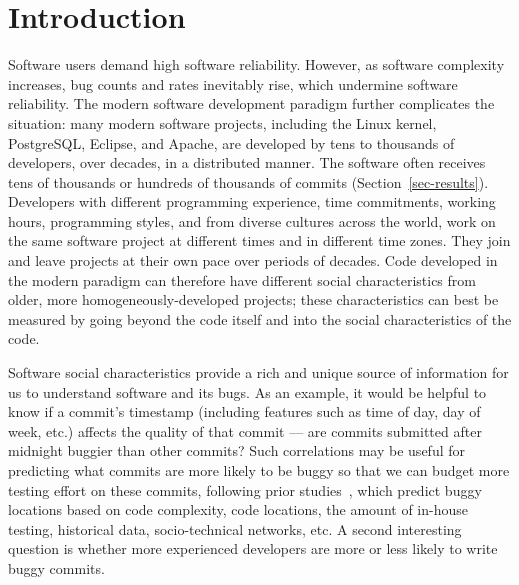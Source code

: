  

\section{Introduction}

Software users demand high software reliability. However, as software complexity
increases, bug counts and rates inevitably rise, which undermine software
reliability. The modern software development paradigm further complicates the
situation: many modern software projects, including the Linux kernel,
PostgreSQL, Eclipse, and Apache, are developed by tens to thousands of
developers, over decades, in a distributed manner. The software often receives
tens of thousands or hundreds of thousands of commits
(Section~\ref{sec-results}). Developers with different programming experience,
time commitments, working hours, programming
styles, and from diverse cultures across the world, work on the same
software project at different times and in different time zones. They join and
leave projects at their own pace over periods of decades. Code developed in the
modern paradigm can therefore have different social characteristics from older,
more homogeneously-developed projects; these characteristics can best be
measured by going beyond the code itself and into the social characteristics of
the code.

Software social characteristics provide a rich and unique source of information
for us to understand software and its bugs. As an example, it would be helpful
to know if a commit's timestamp (including features such as time of day, day of
week, etc.) affects the quality of that commit --- are commits submitted after
midnight buggier than other commits? Such correlations may be useful for
predicting what commits are more likely to be buggy so that we can budget more
testing effort on these commits, following prior
studies~\cite{graves00predicting, guo04robust, Hassan09, libre07, devNetwork08,
 predictionMenzies10, effort03, ostrand05predicting, depGraph08,
 zimmermann-promise-2007}, which predict buggy locations based on code
complexity, code locations, the amount of in-house testing, historical data,
socio-technical networks, etc. A second interesting question is whether more
experienced developers are more or less likely to write buggy commits.


